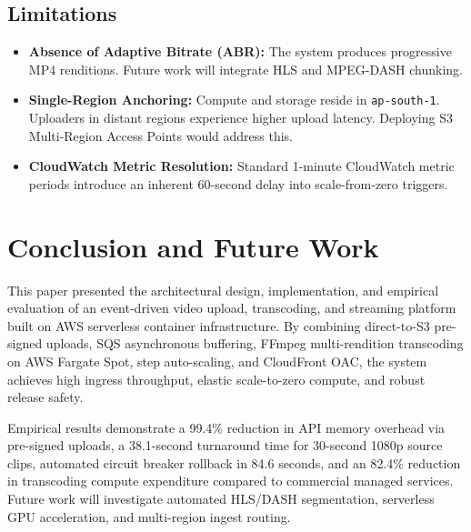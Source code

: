 \documentclass[conference]{IEEEtran}
\begin{document}
\subsection{Limitations}
\begin{itemize}
    \item \textbf{Absence of Adaptive Bitrate (ABR):} The system produces progressive MP4 renditions. Future work will integrate HLS and MPEG-DASH chunking.
    \item \textbf{Single-Region Anchoring:} Compute and storage reside in \texttt{ap-south-1}. Uploaders in distant regions experience higher upload latency. Deploying S3 Multi-Region Access Points would address this.
    \item \textbf{CloudWatch Metric Resolution:} Standard 1-minute CloudWatch metric periods introduce an inherent 60-second delay into scale-from-zero triggers.
\end{itemize}

\section{Conclusion and Future Work}
This paper presented the architectural design, implementation, and empirical evaluation of an event-driven video upload, transcoding, and streaming platform built on AWS serverless container infrastructure. By combining direct-to-S3 pre-signed uploads, SQS asynchronous buffering, FFmpeg multi-rendition transcoding on AWS Fargate Spot, step auto-scaling, and CloudFront OAC, the system achieves high ingress throughput, elastic scale-to-zero compute, and robust release safety.

Empirical results demonstrate a 99.4\% reduction in API memory overhead via pre-signed uploads, a 38.1-second turnaround time for 30-second 1080p source clips, automated circuit breaker rollback in 84.6 seconds, and an 82.4\% reduction in transcoding compute expenditure compared to commercial managed services. Future work will investigate automated HLS/DASH segmentation, serverless GPU acceleration, and multi-region ingest routing.
\end{document}
